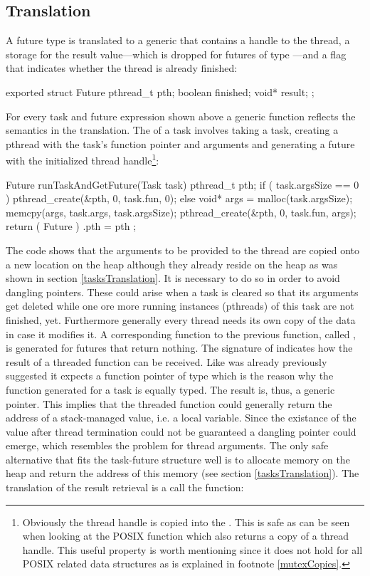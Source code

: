 \subsection{Translation}
\label{futuresTranslation}
A future type  is translated to a generic  that contains a handle to the thread, a storage for the result value---which is dropped for futures of type ---and a flag that indicates whether the thread is already finished:
\begin{ccode}
exported struct Future { 
  pthread_t pth; 
  boolean finished; 
  void* result; 
};
\end{ccode}

For every task and future expression shown above a generic function reflects the semantics in the translation. The  of a task involves taking a task, creating a pthread with the task's function pointer and arguments and generating a future with the initialized thread handle\footnote{Obviously the thread handle is copied into the . This is safe as can be seen when looking at the POSIX function  which also returns a copy of a thread handle. This useful property is worth mentioning since it does not hold for all POSIX related data structures as is explained in footnote \ref{mutexCopies}.}:
\begin{ccode}
Future runTaskAndGetFuture(Task task) { 
  pthread_t pth;
  if ( task.argsSize == 0 ) {
      pthread_create(&pth, 0, task.fun, 0);
  } else {
    void* args = malloc(task.argsSize);
    memcpy(args, task.args, task.argsSize);
    pthread_create(&pth, 0, task.fun, args);
  }
  return ( Future ){ .pth = pth }; 
}
\end{ccode}
The code shows that the arguments to be provided to the thread are copied onto a new location on the heap although they already reside on the heap as was shown in section \ref{tasksTranslation}. It is necessary to do so in order to avoid dangling pointers. These could arise when a task is cleared so that its arguments get deleted while one ore more running instances (pthreads) of this task are not finished, yet. Furthermore generally every thread needs its own copy of the data in case it modifies it. A corresponding function to the previous function, called , is generated for futures that return nothing. The signature of  indicates how the result of a threaded function can be received. Like was already previously suggested it expects a function pointer of type  which is the reason why the function generated for a task is equally typed. The result is, thus, a generic  pointer. This implies that the threaded function could generally return the address of a stack-managed value, i.e. a local variable. Since the existance of the value after thread termination could not be guaranteed a dangling pointer\cite{UnderstandingAndUsingCPointers} could emerge, which resembles the problem for thread arguments. The only safe alternative that fits the task-future structure well is to allocate memory on the heap and return the address of this memory (see section \ref{tasksTranslation}). The translation of the result retrieval is a call the function:

